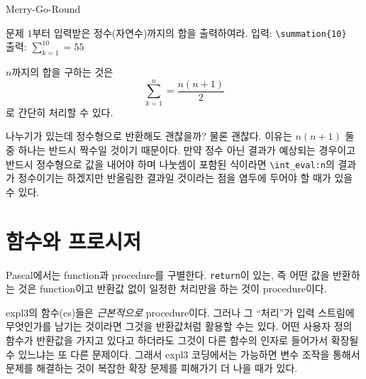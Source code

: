 \documentclass[a4paper,amsmath]{oblivoir}
\begin{document}
\begin{intro}[3]
Merry-Go-Round
\end{intro}

\begin{questiona}{문제}
$1$부터 입력받은 정수(자연수)까지의 합을 출력하여라.
\tcblower
입력: \verb|\summation{10}|\\
출력: $\displaystyle\sum_{k=1}^{10} = 55$
\end{questiona}

$n$까지의 합을 구하는 것은
\[
\sum_{k=1}^{n} = \frac{n(n+1)}{2}
\]
로 간단히 처리할 수 있다. 
나누기가 있는데 정수형으로 반환해도 괜찮을까? 물론 괜찮다. 이유는 $n(n+1)$ 둘 중 하나는 반드시 짝수일 것이기 때문이다.
만약 정수 아닌 결과가 예상되는 경우이고 반드시 정수형으로 값을 내어야 하며 나눗셈이 포함된 식이라면 \verb|\int_eval:n|의 결과가 정수이기는 하겠지만 반올림한 결과일 것이라는 점을 염두에 두어야 할 때가 있을 수 있다.

\section{함수와 프로시저}

Pascal에서는 function과 procedure를 구별한다. \verb|return|이 있는, 즉 어떤 값을 반환하는 것은 function이고 반환값 없이 일정한 처리만을 하는 것이 procedure이다.

expl3의 함수(\textsf{cs})들은 \emph{근본적으로} procedure이다. 그러나 그 “처리”가 입력 스트림에 무엇인가를 남기는 것이라면 그것을 반환값처럼 활용할 수는 있다.
어떤 사용자 정의 함수가 반환값을 가지고 있다고 하더라도 그것이 다른 함수의 인자로 들어가서 확장될 수 있느냐는 또 다른 문제이다. 그래서 expl3 코딩에서는 가능하면 변수 조작을 통해서 문제를 해결하는 것이 복잡한 확장 문제를 피해가기 더 나을 때가 있다.

\end{document}
